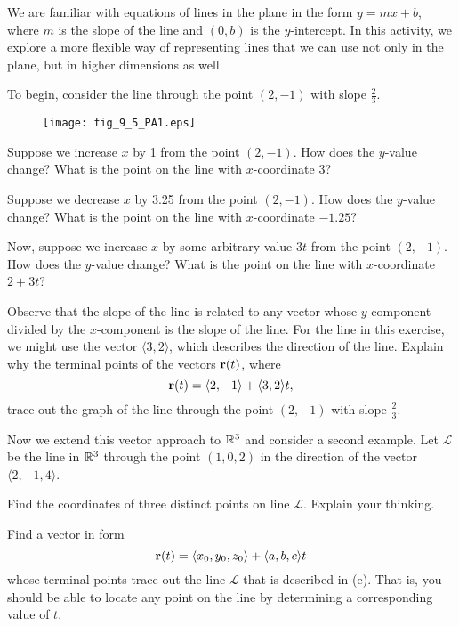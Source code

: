 \begin{pa} \label{PA:9.5}
We are familiar with equations of lines in the plane in the form $y = mx+b$, where $m$ is the slope of the line and $(0,b)$ is the $y$-intercept. In this activity, we explore a more flexible way of representing lines that we can use not only in the plane, but in higher dimensions as well.

To begin, consider the line through the point $(2,-1)$ with slope $\frac{2}{3}$.

\begin{figure}[ht]
  \begin{center}
    \texttt{[image: fig\_9\_5\_PA1.eps]}
  \end{center}
\end{figure}
    \ba
      \item Suppose we increase $x$ by 1 from the point $(2,-1)$. How does the $y$-value change? What is the point on the line with $x$-coordinate $3$?

        \item Suppose we decrease $x$ by 3.25 from the point $(2,-1)$. How does the $y$-value change? What is the point on the line with $x$-coordinate $-1.25$?

        \item Now, suppose we increase $x$ by some arbitrary value $3t$ from the point $(2,-1)$. How does the $y$-value change? What is the point on the line with $x$-coordinate $2+3t$?


        \item Observe that the slope of the line is related to any vector whose $y$-component divided by the $x$-component is the slope of the line. For the line in this exercise, we might use the vector $\langle 3,2 \rangle$, which describes the direction of the line. Explain why the terminal points of the vectors $\mathbf{r}(t)$, where
             \[\mathbf{r}(t) = \langle 2,-1 \rangle + \langle 3,2 \rangle t, \]
             trace out the graph of the line through the point $(2,-1)$ with slope $\frac{2}{3}$.


    \item Now we extend this vector approach to $\mathbb{R}^3$ and consider a second example. Let $\mathcal{L}$ be the line in $\mathbb{R}^3$ through the point $(1,0,2)$ in the direction of the vector $\langle 2, -1, 4 \rangle$.

  Find the coordinates of three distinct points on line $\mathcal{L}$. Explain your thinking.


        \item Find a vector in form
        $$\mathbf{r}(t) = \langle x_0, y_0, z_0 \rangle + \langle a,b,c \rangle t$$ whose terminal points trace out the line $\mathcal{L}$ that is described in (e).  That is, you should be able to locate any point on the line by determining a corresponding value of $t$.
        

    \ea

\end{pa} 



